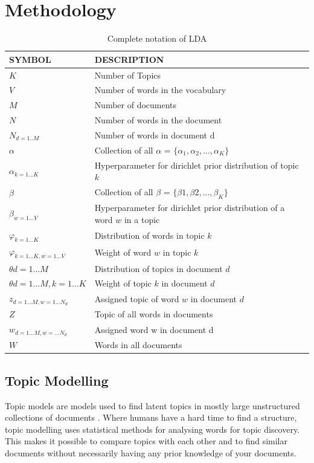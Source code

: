 \chapter{Methodology}  \label{ch:methodology}

\begin{table}[h]
\centering
 \begin{tabular}{l l} 
 \hline
 SYMBOL & DESCRIPTION \\ 
 \hline
 $K$ & Number of Topics \\  
 $V$ & Number of words in the vocabulary \\
 $M$ & Number of documents \\
 $N$ & Number of words in the document \\
 $N_{d=1..M}$ & Number of words in document d\\
 $\alpha$ & Collection of all $\alpha$ = $ \{ \alpha_{1},\alpha_{2}, ... , \alpha_{K}\}$ \\
 $\alpha_{k=1...K}$ & Hyperparameter for dirichlet prior distribution of topic $k$ \\
 $\beta$ &  Collection of all $\beta$ = $\{\beta{1},\beta{2}, ... , \beta_{K}\}$ \\
 $\beta_{w=1...V}$ & Hyperparameter for dirichlet prior distribution of a word $w$ in a topic \\
 $\varphi_{k=1...K}$ & Distribution of words in topic $k$ \\
 $\varphi_{k=1...K, w=1...V}$ & Weight of  word $w$ in topic $k$  \\
 $\theta{d=1...M}$ & Distribution of topics in document $d$  \\
 $\theta{d=1...M, k=1...K}$ & Weight of  topic $k$ in document $d$ \\
 $z_{d=1...M, w=1...N_d}$ & Assigned topic of word $w$ in document $d$\\
 $Z$ & Topic of all words in documents \\
 $w_{d=1...M, w=...N_d}$ & Assigned word w in document d \\ 
 $W$ & Words in all documents \\ 

 

 
 \hline
 \end{tabular}
\caption{Complete notation of LDA}
\label{tab:table1}
\end{table}

\section{Topic Modelling}
Topic models are models used to find latent topics in mostly large unstructured collections of documents \cite{Blei2010ProbabilisticModels}. Where humans have a hard time to find a structure, topic modelling uses statistical methods for analysing words for topic discovery. This makes it possible to compare topics with each other and to find similar documents without necessarily having any prior knowledge of your documents. 


